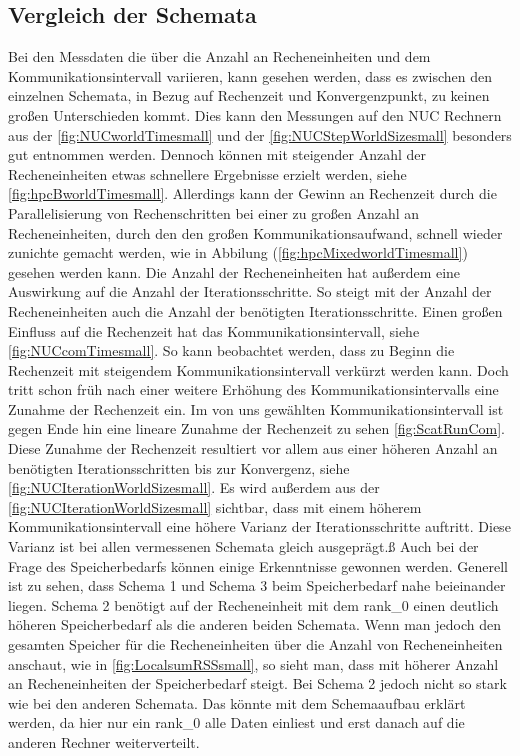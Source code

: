 \subsection{Vergleich der Schemata}
Bei den Messdaten die über die Anzahl an Recheneinheiten und dem Kommunikationsintervall variieren, kann gesehen werden, dass es zwischen den einzelnen Schemata, in Bezug auf Rechenzeit und Konvergenzpunkt, zu keinen großen Unterschieden kommt. Dies kann den Messungen auf den NUC Rechnern aus der \autoref{fig:NUCworldTimesmall} und der \autoref{fig:NUCStepWorldSizesmall} besonders gut entnommen werden. Dennoch können mit steigender Anzahl der Recheneinheiten etwas schnellere Ergebnisse erzielt werden, siehe \autoref{fig:hpcBworldTimesmall}. Allerdings kann der Gewinn an Rechenzeit durch die Parallelisierung von Rechenschritten bei einer zu großen Anzahl an Recheneinheiten, durch den den großen Kommunikationsaufwand, schnell wieder zunichte gemacht werden, wie in Abbilung (\autoref{fig:hpcMixedworldTimesmall}) gesehen werden kann. Die Anzahl der Recheneinheiten hat außerdem eine Auswirkung auf die Anzahl der Iterationsschritte. So steigt mit der Anzahl der Recheneinheiten auch die Anzahl der benötigten Iterationsschritte. Einen großen Einfluss auf die Rechenzeit hat das Kommunikationsintervall, siehe \autoref{fig:NUCcomTimesmall}. So kann beobachtet werden, dass zu Beginn die Rechenzeit mit steigendem Kommunikationsintervall verkürzt werden kann. Doch tritt schon früh nach einer weitere Erhöhung des Kommunikationsintervalls eine Zunahme der Rechenzeit ein. Im von uns gewählten Kommunikationsintervall ist gegen Ende hin eine lineare Zunahme der Rechenzeit zu sehen \autoref{fig:ScatRunCom}. Diese Zunahme der Rechenzeit resultiert vor allem aus einer höheren Anzahl an benötigten Iterationsschritten bis zur Konvergenz, siehe \autoref{fig:NUCIterationWorldSizesmall}. Es wird außerdem aus der \autoref{fig:NUCIterationWorldSizesmall} sichtbar, dass mit einem höherem Kommunikationsintervall eine höhere Varianz der Iterationsschritte auftritt. Diese Varianz ist bei allen vermessenen Schemata gleich ausgeprägt.ß Auch bei der Frage des Speicherbedarfs können einige Erkenntnisse gewonnen werden. Generell ist zu sehen, dass Schema 1 und Schema 3 beim Speicherbedarf nahe beieinander liegen. Schema 2 benötigt auf der Recheneinheit mit dem rank\_0 einen deutlich höheren Speicherbedarf als die anderen beiden Schemata. Wenn man jedoch den gesamten Speicher für die Recheneinheiten über die Anzahl von Recheneinheiten anschaut, wie in \autoref{fig:LocalsumRSSsmall}, so sieht man, dass mit höherer Anzahl an Recheneinheiten der Speicherbedarf steigt. Bei Schema 2 jedoch nicht so stark wie bei den anderen Schemata. Das könnte mit dem Schemaaufbau erklärt werden, da hier nur ein rank\_0 alle Daten einliest und erst danach auf die anderen Rechner weiterverteilt.\\
